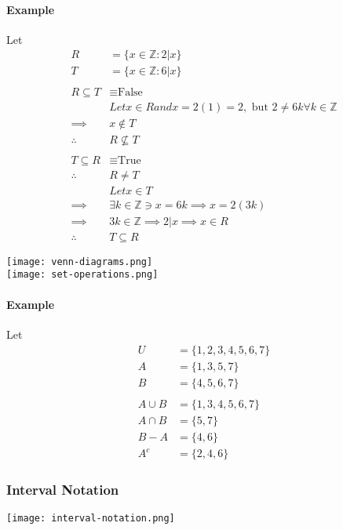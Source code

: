 \paragraph*{Example}
Let
\begin{align*}
    R &= \{x \in \mathbb{Z} : 2|x\}\\
    T &= \{x \in \mathbb{Z} : 6|x\}\\
    \\
    R \subseteq T &\equiv \text{False}\\
    & Let x \in R and x = 2(1) = 2, \text{ but } 2 \neq 6k \forall k \in \mathbb{Z}\\
    \implies \quad & x \notin T\\
    \therefore \quad & R \nsubseteq T\\
    \\
    T \subseteq R &\equiv \text{True}\\
    \therefore \quad & R \neq T\\
    & Let x \in T\\
    \implies \quad & \exists k \in \mathbb{Z} \ni x = 6k \implies x = 2(3k)\\
    \implies \quad & 3k \in \mathbb{Z} \implies 2 | x \implies x \in R\\
    \therefore \quad & T \subseteq{R}
\end{align*}

\begin{center}
    \texttt{[image: venn-diagrams.png]}\\
    \texttt{[image: set-operations.png]}
\end{center}

\paragraph*{Example}
Let 
\begin{align*}
    U &= \{1, 2, 3, 4, 5, 6, 7\}\\
    A &= \{1, 3, 5, 7\}\\
    B &= \{4, 5, 6, 7\}\\
    \\
    A \cup B &= \{1, 3, 4, 5, 6, 7\}\\
    A \cap B &= \{5, 7\}\\
    B - A &= \{4, 6\}\\
    A^c &= \{2, 4, 6\}
\end{align*}

\subsubsection*{Interval Notation}
\texttt{[image: interval-notation.png]}

